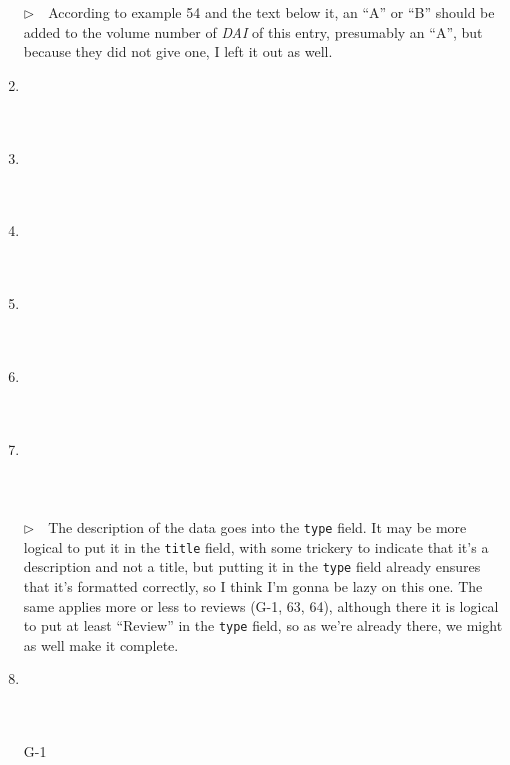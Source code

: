 \documentclass{article}
\newcommand{\EM}{\ensuremath{\triangleright\quad}}
\newcommand{\fieldname}[1]{\texttt{#1}}%
\begin{document}
\begin{enumerate}
      \EM According to example 54 and the text below it, an ``A''
      or ``B'' should be added to the volume number of \emph{DAI}
      of this entry, presumably an ``A'', but because they did not
      give one, I left it out as well.
\item \cite{ex56} \\ \cite{ex56}\\ \\ 
\item \cite{ex57} \\ \cite{ex57}\\ \\ 
\item \cite{ex58} \\ \cite{ex58}\\ \\ 
\item \cite{ex59} \\ \cite{ex59}\\ \\ 
\item \cite{ex60} \\ \cite{ex60}\\ \\ 
\item \cite{ex61} \\ \cite{ex61}\\ \\ \\
      \EM The description of the data goes into the
      \fieldname{type} field. It may be more logical to put it
      in the \fieldname{title} field, with some trickery to indicate
      that it's a description and not a title, but putting it in the
      \fieldname{type} field already ensures that it's formatted
      correctly, so I think I'm gonna be lazy on this one. The same
      applies more or less to reviews (G-1, 63, 64), although there
      it is logical to put at least ``Review'' in the \fieldname{type}
      field, so as we're already there, we might as well make it
      complete.
\item \cite{ex62} \\ \cite{ex62}\\ \\ 
\item[G-1] \cite{G-1}  \\ \cite{G-1} \\  \\ \\

\end{enumerate}
\end{document}
